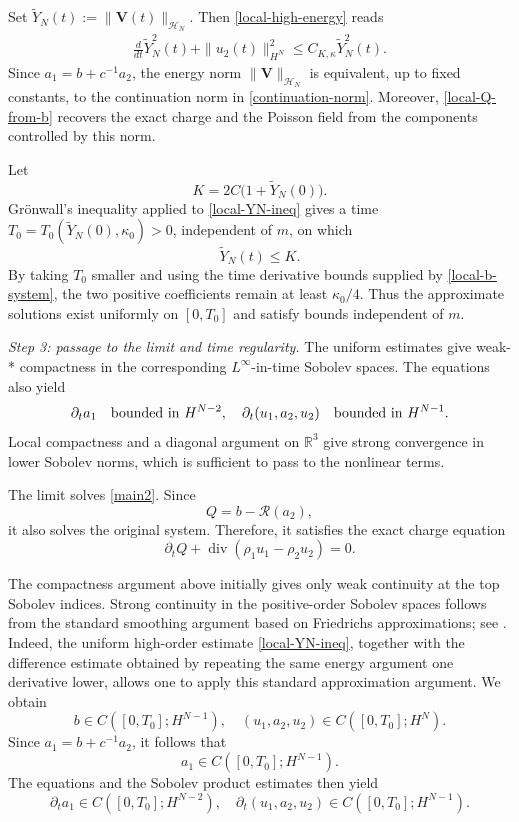 \documentclass[10pt,reqno]{amsart}
\numberwithin{equation}{section}
\begin{document}
Set $\widetilde Y_N(t):=\|\mathbf V(t)\|_{\mathscr H_N}$. Then \eqref{local-high-energy} reads
\begin{align}\label{local-YN-ineq} 
\frac{d}{dt}\widetilde Y_N^2(t) +\|u_2(t)\|_{H^N}^2 \le C_{K,\kappa}\widetilde Y_N^2(t).
\end{align}
Since $a_1=b+c^{-1}a_2$, the energy norm
$\|\mathbf V\|_{\mathscr H_N}$ is equivalent, up to fixed
constants, to the continuation norm in
\eqref{continuation-norm}. Moreover, \eqref{local-Q-from-b} recovers
the exact charge and the Poisson field from the components controlled
by this norm.

Let
\[
K=2C\bigl(1+\widetilde Y_N(0)\bigr).
\]
Gr\"onwall's inequality applied to \eqref{local-YN-ineq} gives a time $T_0=T_0(\widetilde Y_N(0),\kappa_0)>0$, independent of $m$, on which
\[
\widetilde Y_N(t)\le K.
\]
By taking $T_0$ smaller and using the time derivative bounds supplied by \eqref{local-b-system}, the two positive coefficients remain at least $\kappa_0/4$. Thus the approximate solutions exist uniformly on $[0,T_0]$ and satisfy bounds independent of $m$.

\medskip
\noindent\emph{Step 3: passage to the limit and time regularity.} The uniform estimates give weak-* compactness in the corresponding $L^\infty$-in-time Sobolev spaces. The equations also yield
\[
\partial_ta_1 \quad\hbox{bounded in }H^{N-2}, \quad \partial_t(u_1,a_2,u_2) \quad\hbox{bounded in }H^{N-1}.
\]
Local compactness and a diagonal argument on $\mathbb R^3$ give strong convergence in lower Sobolev norms, which is sufficient to pass to the nonlinear terms.

The limit solves \eqref{main2}. Since
\[
Q=b-\mathcal R(a_2),
\]
it also solves the original system. Therefore, it satisfies the exact charge equation
\begin{equation}\label{local-charge-equation}
\partial_tQ
+\operatorname{div}(\rho_1u_1-\rho_2u_2)=0.
\end{equation}

The compactness argument above initially gives only weak continuity at the top Sobolev indices. Strong continuity in the positive-order Sobolev spaces follows from the standard smoothing argument based on Friedrichs approximations; see \cite{BS75,K75}. Indeed, the uniform high-order estimate \eqref{local-YN-ineq}, together with the difference estimate obtained by repeating the same energy argument one derivative lower, allows one to apply this standard approximation argument. We obtain
\[
b\in C([0,T_0];H^{N-1}), \quad (u_1,a_2,u_2)\in C([0,T_0];H^N).
\]
Since $a_1=b+c^{-1}a_2$, it follows that
\[
a_1\in C([0,T_0];H^{N-1}).
\]
The equations and the Sobolev product estimates then yield
\[
\partial_ta_1\in C([0,T_0];H^{N-2}), \quad \partial_t(u_1,a_2,u_2) \in C([0,T_0];H^{N-1}).
\]
\end{document}
